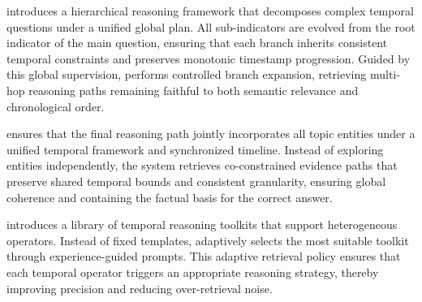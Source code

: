 \mot introduces a hierarchical reasoning framework that decomposes complex temporal questions under a unified global plan. 
All sub-indicators are evolved from the root indicator of the main question, ensuring that each branch inherits consistent temporal constraints and preserves monotonic timestamp progression.  
Guided by this global supervision, \mot performs controlled branch expansion, retrieving multi-hop reasoning paths remaining faithful to both semantic relevance and chronological order.  

\mot ensures that the final reasoning path jointly incorporates all topic entities under a unified temporal framework and synchronized timeline.  
Instead of exploring entities independently, the system retrieves co-constrained evidence paths that preserve shared temporal bounds and consistent granularity, ensuring global coherence and containing the factual basis for the correct answer.

\mot introduces a library of temporal reasoning toolkits that support heterogeneous operators.
Instead of fixed templates, \mot adaptively selects the most suitable toolkit through experience-guided prompts.
This adaptive retrieval policy ensures that each temporal operator triggers an appropriate reasoning strategy, thereby improving precision and reducing over-retrieval noise.

